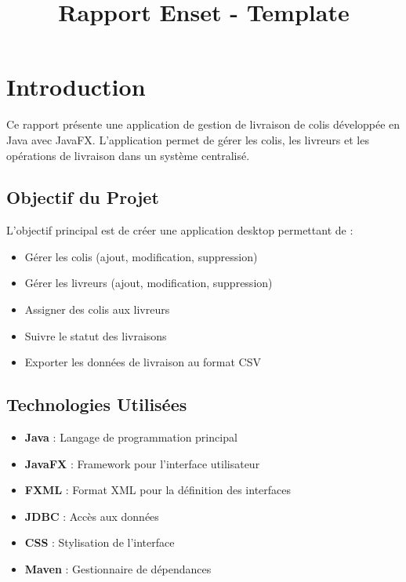 \documentclass{rapportENSIAS}
\title{Rapport Enset - Template} %
\begin{document}




        
\fairemarges %
\fairepagedegarde %
\tabledematieres %



\section{Introduction}

Ce rapport pr\'{e}sente une application de gestion de livraison de colis d\'{e}velopp\'{e}e en Java avec JavaFX. L'application permet de g\'{e}rer les colis, les livreurs et les op\'{e}rations de livraison dans un syst\`{e}me centralis\'{e}.

\subsection{Objectif du Projet}

L'objectif principal est de cr\'{e}er une application desktop permettant de :
\begin{itemize}
    \item G\'{e}rer les colis (ajout, modification, suppression)
    \item G\'{e}rer les livreurs (ajout, modification, suppression)
    \item Assigner des colis aux livreurs
    \item Suivre le statut des livraisons
    \item Exporter les donn\'{e}es de livraison au format CSV
\end{itemize}

\subsection{Technologies Utilis\'{e}es}

\begin{itemize}
    \item \textbf{Java} : Langage de programmation principal
    \item \textbf{JavaFX} : Framework pour l'interface utilisateur
    \item \textbf{FXML} : Format XML pour la d\'{e}finition des interfaces
    \item \textbf{JDBC} : Acc\`{e}s aux donn\'{e}es
    \item \textbf{CSS} : Stylisation de l'interface
    \item \textbf{Maven} : Gestionnaire de d\'{e}pendances
\end{itemize}
\end{document}

